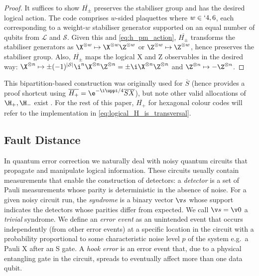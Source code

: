 \begin{proof}
	It suffices to show $\overline{H_\pm}$ preserves the stabiliser group
	and has the desired logical action.
	The code comprises $w$-sided plaquettes where $w \in `{4, 6}$,
	each corresponding to a weight-$w$ stabiliser generator
	supported on an equal number of qubits from $\mathcal{L}$ and $\mathcal{S}$.
	Given this and \cref{eq:h_pm_action},
	$\overline{H_\pm}$ transforms the stabiliser generators as
	$\X^{\otimes w} \mapsto \X^{\otimes w} \Z^{\otimes w}$
	or $\Z^{\otimes w} \mapsto \Z^{\otimes w}$,
	hence preserves the stabiliser group.
	Also,
	$\overline{H_\pm}$ maps the logical X and Z observables in the desired way:
	$\X^{\otimes n}
	\mapsto\pm (-1)^{|\mathcal S|} \i^n \X^{\otimes n} \Z^{\otimes n}
	=\pm \i \X^{\otimes n} \Z^{\otimes n}$
	and $\Z^{\otimes n} \mapsto -\Z^{\otimes n}$.
\end{proof}
\noindent
This bipartition-based construction
was originally used for $\overline{S}$
\cite[\S II.C]{Kubica2015}
(hence provides a proof shortcut using $\overline{H_+} =\e^{-\i \uppi/4} \overline{SX}$),
but note other valid allocations of $\H_+, \H_-$ exist
\cite[Lemma~3]{Tansuwannont2025}.
For the rest of this paper,
$\overline{H_+}$ for hexagonal colour codes will refer to
the implementation in \cref{eq:logical_H_is_transversal}.

\subsection{Fault Distance}\label{sec:fault_distance}
In quantum error correction we naturally deal with
noisy quantum circuits that propagate and manipulate logical information.
These circuits usually contain measurements
that enable the construction of detectors:
a \emph{detector} is a set of Pauli measurements
whose parity is deterministic in the absence of noise.
For a given noisy circuit run,
the \emph{syndrome} is a binary vector $\v s$ whose support
indicates the detectors whose parities differ from expected.
We call $\v s =\v 0$ a \emph{trivial} syndrome.
We define an \emph{error event} as an unintended event
that occurs independently (from other error events)
at a specific location in the circuit
with a probability proportional to
some characteristic noise level $p$ of the system
e.g.\ a Pauli X after an S gate.
A \emph{hook error} is an error event that,
due to a physical entangling gate in the circuit,
spreads to eventually affect more than one data qubit.

